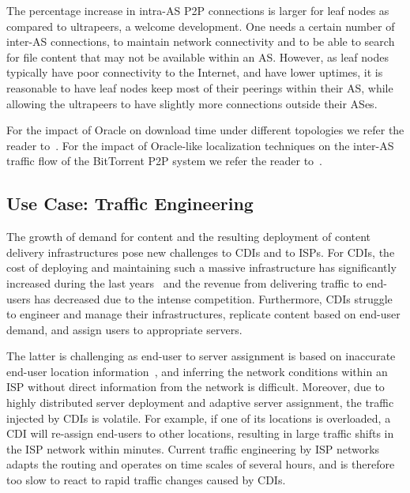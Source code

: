 The percentage increase in intra-AS P2P connections is larger for leaf nodes as compared
to ultrapeers, a welcome development.  One needs a certain number of inter-AS connections,
to maintain network connectivity and to be able to search for file content that may not be
available within an AS. However, as leaf nodes typically have poor connectivity to the
Internet, and have lower uptimes, it is reasonable to have leaf nodes keep most of their
peerings within their AS, while allowing the ultrapeers to have slightly more connections
outside their ASes.

For the impact of Oracle on download time under different topologies we refer
the reader to~\cite{improving-oracle-GI-2008}. For the impact of Oracle-like
localization techniques on the inter-AS traffic flow of the BitTorrent P2P
system we refer the reader to~\cite{DeepDiving,LocalityP2P,BlindMiceBT,Impact-Profitability}.


\subsection{Use Case: Traffic Engineering}\label{sec:te-cate}

The growth of demand for content and the resulting deployment of content
delivery infrastructures pose new challenges to CDIs and to ISPs. For CDIs, the
cost of deploying and maintaining such a massive infrastructure has
significantly increased during the last years~\cite{AkamaiCutting:2009} and the
revenue from delivering traffic to end-users has decreased due to the intense
competition. Furthermore, CDIs struggle to engineer and manage their
infrastructures, replicate content based on end-user demand, and assign users
to appropriate servers.

The latter is challenging as end-user to server assignment is based on
inaccurate end-user location
information~\cite{Precise:Mao2002,DNS-extension-IP-client}, and inferring the
network conditions within an ISP without direct information from the network is
difficult. Moreover, due to highly distributed server deployment and adaptive
server assignment, the traffic injected by CDIs is volatile. For example, if
one of its locations is overloaded, a CDI will re-assign end-users to other
locations, resulting in large traffic shifts in the ISP network within minutes.
Current traffic engineering by ISP networks adapts the routing and operates on
time scales of several hours, and is therefore too slow to react to rapid
traffic changes caused by CDIs.

